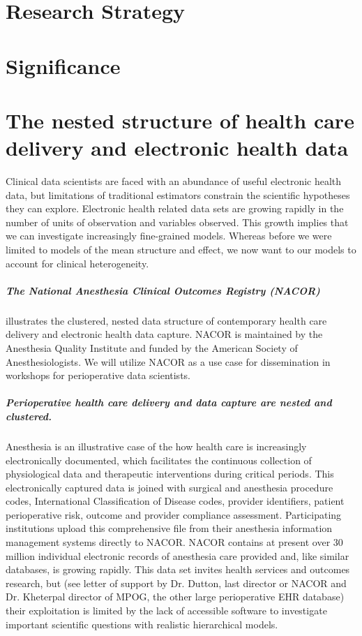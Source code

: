 \documentclass[11pt,notitlepage]{article}
\begin{document}
\section*{Research Strategy}

\section*{Significance}

\section*{The nested structure of health care delivery and electronic health data}
Clinical data scientists are faced with an abundance of useful electronic health data, 
but limitations of traditional estimators constrain the scientific hypotheses they can explore. 
Electronic health related data sets are growing rapidly in the number of units of observation and 
variables observed. This growth implies that we can investigate increasingly fine-grained 
models. Whereas before we were limited to models of the mean structure and effect, we 
now want to our models to account for clinical heterogeneity.

\subparagraph*{The National Anesthesia Clinical Outcomes Registry (NACOR)} illustrates 
the clustered, nested data structure of contemporary health  care delivery and electronic health data capture. 
NACOR is maintained by the Anesthesia Quality Institute and funded by the American Society of 
Anesthesiologists. We will utilize NACOR as a use case for dissemination in workshops for perioperative data scientists.

\subparagraph*{Perioperative health care delivery and data capture are nested and clustered.}
Anesthesia is an illustrative case of the how health care is increasingly 
electronically documented, which facilitates the continuous collection of 
physiological data and therapeutic interventions during critical periods. 
This electronically captured data 
is joined with surgical and anesthesia procedure codes, International 
Classification of Disease codes, provider identifiers, patient perioperative 
risk, outcome and provider compliance assessment. Participating institutions upload 
this comprehensive file from their anesthesia information management systems
directly to NACOR. NACOR contains at present over 30 million individual 
electronic records of anesthesia care provided and, like similar databases, is 
growing rapidly. This data set invites health services and outcomes research, 
but (see letter of support by Dr. Dutton, last director or 
NACOR and Dr. Kheterpal director of MPOG, the other large perioperative EHR 
database) their exploitation is limited by the lack of accessible software to investigate 
important scientific questions with realistic hierarchical models.
\end{document}
